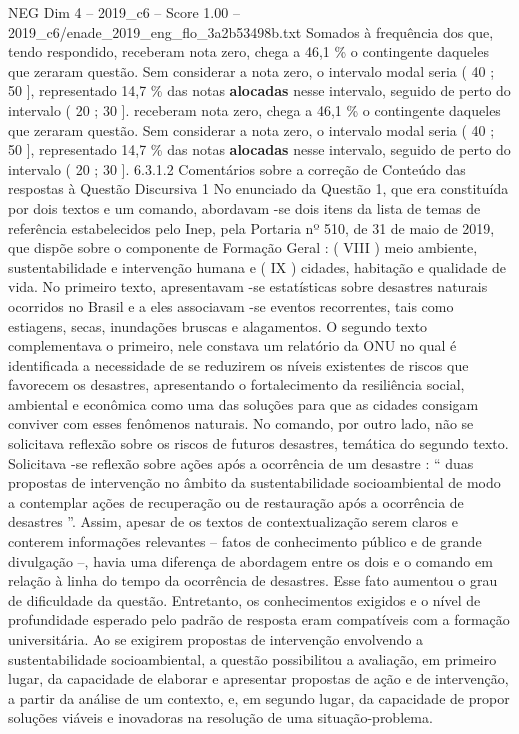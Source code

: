 \begin{textsample}{NEG Dim 4 – 2019\_c6 – Score 1.00 – 2019\_c6/enade\_2019\_eng\_flo\_3a2b53498b.txt}
Somados à frequência dos que, tendo respondido, receberam nota zero, chega a 46,1 \% o contingente daqueles que zeraram questão.
Sem considerar a nota zero, o intervalo modal seria ( 40 ; 50 ], representado 14,7 \% das notas \textbf{alocadas} nesse intervalo, seguido de perto do intervalo ( 20 ; 30 ]. receberam nota zero, chega a 46,1 \% o contingente daqueles que zeraram questão.
Sem considerar a nota zero, o intervalo modal seria ( 40 ; 50 ], representado 14,7 \% das notas \textbf{alocadas} nesse intervalo, seguido de perto do intervalo ( 20 ; 30 ]. 6.3.1.2 Comentários sobre a correção de Conteúdo das respostas à Questão Discursiva 1 No enunciado da Questão 1, que era constituída por dois textos e um comando, abordavam -se dois itens da lista de temas de referência estabelecidos pelo Inep, pela Portaria nº 510, de 31 de maio de 2019, que dispõe sobre o componente de Formação Geral : ( VIII ) meio ambiente, sustentabilidade e intervenção humana e ( IX ) cidades, habitação e qualidade de vida.
No primeiro texto, apresentavam -se estatísticas sobre desastres naturais ocorridos no Brasil e a eles associavam -se eventos recorrentes, tais como estiagens, secas, inundações bruscas e alagamentos.
O segundo texto complementava o primeiro, nele constava um relatório da ONU no qual é identificada a necessidade de se reduzirem os níveis existentes de riscos que favorecem os desastres, apresentando o fortalecimento da resiliência social, ambiental e econômica como uma das soluções para que as cidades consigam conviver com esses fenômenos naturais.
No comando, por outro lado, não se solicitava reflexão sobre os riscos de futuros desastres, temática do segundo texto.
Solicitava -se reflexão sobre ações após a ocorrência de um desastre : “ duas propostas de intervenção no âmbito da sustentabilidade socioambiental de modo a contemplar ações de recuperação ou de restauração após a ocorrência de desastres ”.
Assim, apesar de os textos de contextualização serem claros e conterem informações relevantes – fatos de conhecimento público e de grande divulgação –, havia uma diferença de abordagem entre os dois e o comando em relação à linha do tempo da ocorrência de desastres.
Esse fato aumentou o grau de dificuldade da questão.
Entretanto, os conhecimentos exigidos e o nível de profundidade esperado pelo padrão de resposta eram compatíveis com a formação universitária.
Ao se exigirem propostas de intervenção envolvendo a sustentabilidade socioambiental, a questão possibilitou a avaliação, em primeiro lugar, da capacidade de elaborar e apresentar propostas de ação e de intervenção, a partir da análise de um contexto, e, em segundo lugar, da capacidade de propor soluções viáveis e inovadoras na resolução de uma situação-problema.

\end{textsample}

